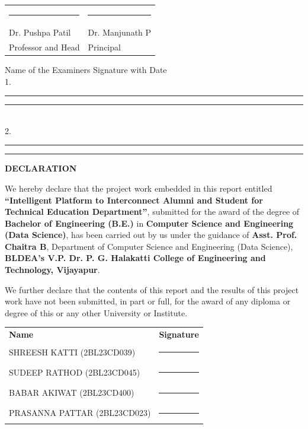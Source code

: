 \documentclass[12pt,a4paper]{report}
\begin{document}
\vspace{0.5cm}

\noindent
\begin{tabular}{p{7cm}p{7cm}}
\centering\rule{6cm}{0.4pt} & \centering\rule{6cm}{0.4pt}\\[-2pt]
\centering Dr. Pushpa Patil & \centering Dr. Manjunath P\\[3pt]
\centering Professor and Head & \centering Principal\\
\end{tabular}

\vspace{0.5cm}

{\small
\noindent Name of the Examiners \hfill Signature with Date\\[4pt]
1.\ \rule{7cm}{0.4pt}\hfill\rule{7cm}{0.4pt}\\[3pt]
2.\ \rule{7cm}{0.4pt}\hfill\rule{7cm}{0.4pt}
}


\clearpage
\thispagestyle{empty}
\begin{center}
{\large\bfseries DECLARATION}\\[0.8cm]
\end{center}

\noindent
We hereby declare that the project work embedded in this report entitled \textbf{``Intelligent Platform to Interconnect Alumni and Student for Technical Education Department''}, submitted for the award of the degree of \textbf{Bachelor of Engineering (B.E.)} in \textbf{Computer Science and Engineering (Data Science)}, has been carried out by us under the guidance of \textbf{Asst. Prof. Chaitra B}, Department of Computer Science and Engineering (Data Science), \textbf{BLDEA's V.P. Dr. P. G. Halakatti College of Engineering and Technology, Vijayapur}.

\medskip

\noindent
We further declare that the contents of this report and the results of this project work have not been submitted, in part or full, for the award of any diploma or degree of this or any other University or Institute.

\vspace{1.5cm}

\noindent
\begin{tabular}{p{9cm}p{4cm}}
\textbf{Name} & \textbf{Signature}\\[0.3cm]
SHREESH KATTI (2BL23CD039)    & \rule{4cm}{0.4pt} \\
SUDEEP RATHOD (2BL23CD045)    & \rule{4cm}{0.4pt} \\
BABAR AKIWAT (2BL23CD400)     & \rule{4cm}{0.4pt} \\
PRASANNA PATTAR (2BL23CD023)  & \rule{4cm}{0.4pt} \\
\end{tabular}
\end{document}
